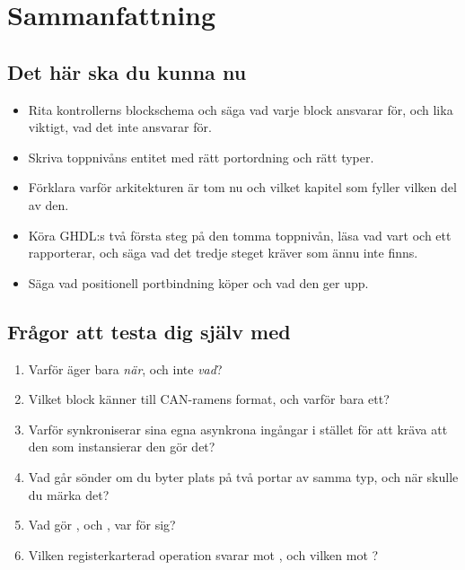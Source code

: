 
\section{Sammanfattning}
\label{c11:sec:review}

\subsection*{Det här ska du kunna nu}
\begin{itemize}
  \item Rita kontrollerns blockschema och säga vad varje block ansvarar för, och lika viktigt, vad
    det inte ansvarar för.
  \item Skriva toppnivåns entitet med rätt portordning och rätt typer.
  \item Förklara varför arkitekturen är tom nu och vilket kapitel som fyller vilken del av den.
  \item Köra GHDL:s två första steg på den tomma toppnivån, läsa vad vart och ett rapporterar, och
    säga vad det tredje steget kräver som ännu inte finns.
  \item Säga vad positionell portbindning köper och vad den ger upp.
\end{itemize}

\subsection*{Frågor att testa dig själv med}
\begin{enumerate}
  \item Varför äger  bara \emph{när}, och inte \emph{vad}?
  \item Vilket block känner till CAN-ramens format, och varför bara ett?
  \item Varför synkroniserar  sina egna asynkrona ingångar i stället för att
    kräva att den som instansierar den gör det?
  \item Vad går sönder om du byter plats på två portar av samma typ, och när skulle du märka det?
  \item Vad gör ,  och , var för sig?
  \item Vilken registerkarterad operation svarar mot , och vilken mot ?
\end{enumerate}

